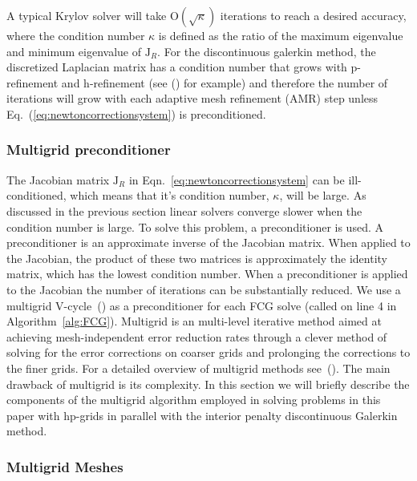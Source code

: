 A typical Krylov solver will take $\mathrm{O}(\sqrt{\kappa})$
iterations to reach a desired accuracy, where the condition number
$\kappa$ is defined as the ratio of the maximum eigenvalue and minimum
eigenvalue of $\mathrm{J}_R$. For the  discontinuous
galerkin method, the discretized Laplacian matrix has a condition
number that grows with p-refinement and h-refinement (see (\citet*{antonietti2011class,hesthaven2008nodal}) for example) and therefore the number of iterations will grow with each adaptive mesh refinement (AMR) step unless Eq.~(\ref{eq:newtoncorrectionsystem}) is preconditioned.

\subsubsection{Multigrid preconditioner}

The Jacobian matrix $\mathrm{J}_R$ in Eqn.~\ref{eq:newtoncorrectionsystem} can be ill-conditioned, which means that it's condition number, $\kappa$, will be large. As discussed in the previous section linear solvers converge slower when the condition number is large. To solve this problem, a preconditioner is used. A preconditioner is an approximate inverse of the Jacobian matrix. When applied to the Jacobian, the product of these two matrices is approximately the identity matrix, which has the lowest condition number. When a preconditioner is applied to the Jacobian the number of iterations can be substantially reduced.
We use a multigrid V-cycle~(\citet*{briggs2000multigrid}) as a preconditioner for each
FCG solve (called on line 4 in Algorithm~\ref{alg:FCG}). 
Multigrid is an multi-level iterative method aimed at achieving
mesh-independent error reduction rates through a clever method of
solving for the error corrections on coarser grids and prolonging the
corrections to the finer grids. For a detailed overview of multigrid
methods see~(\citet*{briggs2000multigrid}). The main drawback of multigrid
is its complexity. In this section we will briefly describe the
components of the multigrid algorithm employed in solving problems in
this paper with hp-grids in parallel with the interior penalty
discontinuous Galerkin method.

\subsubsection{Multigrid Meshes}
\label{sec:MultigridMeshes}

